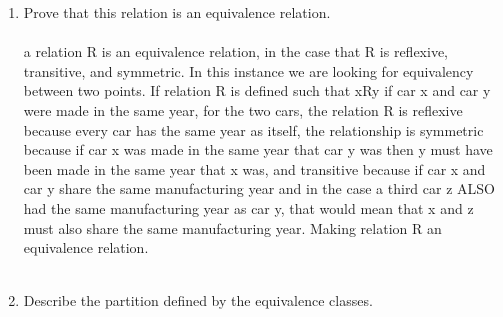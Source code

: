   \begin{enumerate}[label=(\alph*)]
    \item Prove that this relation is an equivalence relation.
\\\\
  a relation R is an equivalence relation, in the case that R is reflexive, transitive, and symmetric. In this instance we are looking for equivalency between two points. If relation R is defined such that xRy if car x and car y were made in the same year, for the two cars, the relation R is reflexive because every car has the same year as itself, the relationship is symmetric because if car x was made in the same year that car y was then y must have been made in the same year that x was, and transitive because if car x and car y share the same manufacturing year and in the case a third car z ALSO had the same manufacturing year as car y, that would mean that x and z must also share the same manufacturing year. Making relation R an equivalence relation.
\\\\
    \item Describe the partition defined by the equivalence classes.
\\\\

\end{enumerate}
